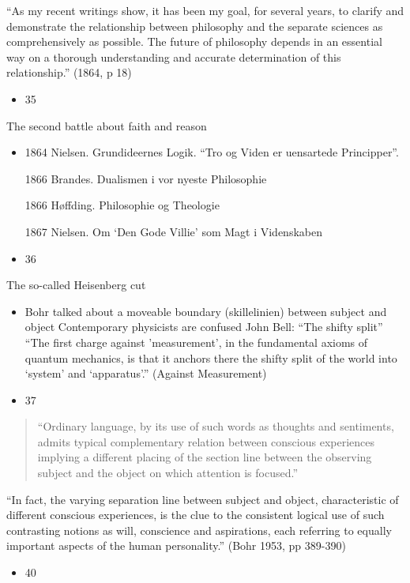 \documentclass{beamer}
\begin{document}
\begin{frame}{“As my recent writings show, it has been my goal, for several years, to clarify and demonstrate the relationship between philosophy and the separate sciences as comprehensively as possible. The future of philosophy depends in an essential way on a thorough understanding and accurate determination of this relationship.” (1864, p 18)}
\begin{itemize}
  \item 35
\end{itemize}
\end{frame}
\begin{frame}{The second battle about faith and reason}
\begin{itemize}
  \item 1864  Nielsen. Grundideernes Logik.
	“Tro og Viden er uensartede Principper”.

1866  Brandes. Dualismen i vor  nyeste Philosophie

1866  Høffding. Philosophie og  Theologie

1867  Nielsen. Om ‘Den Gode Villie’ som Magt i Videnskaben
  \item 36
\end{itemize}
\end{frame}
\begin{frame}{The so-called Heisenberg cut}
\begin{itemize}
  \item Bohr talked about a moveable boundary (skillelinien) between subject and object
Contemporary physicists are confused
John Bell: “The shifty split”
“The first charge against 'measurement', in the fundamental axioms of quantum mechanics, is that it anchors there the shifty split of the world into ‘system’ and ‘apparatus’.” (Against Measurement)
  \item 37
\end{itemize}
\end{frame}
\begin{frame}{38}
\end{frame}
\begin{frame}{39}
\begin{quote}
“Ordinary language, by its use of such words as thoughts and sentiments, admits typical complementary relation between conscious experiences implying a different placing of the section line between the observing subject and the object on which attention is focused.”
\end{quote}
\end{frame}
\begin{frame}{“In fact, the varying separation line between subject and object, characteristic of different conscious experiences, is the clue to the consistent logical use of such contrasting notions as will, conscience and aspirations, each referring to equally important aspects of the human personality.” (Bohr 1953, pp 389-390)}
\begin{itemize}
  \item 40
\end{itemize}
\end{frame}
\end{document}
